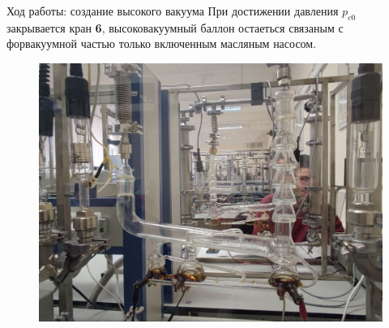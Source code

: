 \begin{frame}{Ход работы: создание высокого вакуума}
    При достижении давления \(p_{c0}\) закрывается кран \textbf{6},  высоковакуумный баллон остаеться связаным с форвакуумной частью только включенным масляным насосом.
    \begin{figure}[h]
        \centering
        \includegraphics[scale = 0.15]{images/oil_valve.jpg}
    \end{figure}
\end{frame}



